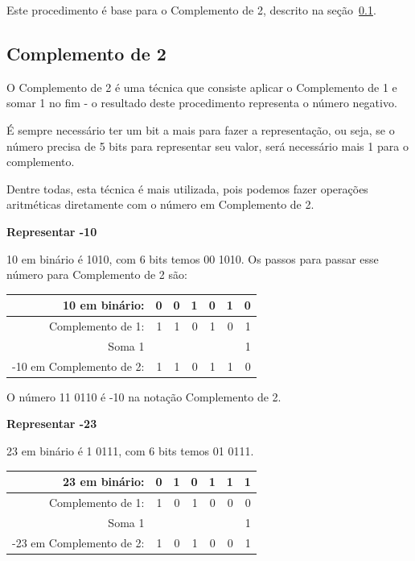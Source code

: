 Este procedimento é base para o Complemento de 2, descrito na seção~\ref{compl2}. 

\subsection{Complemento de 2}
\label{compl2}
O Complemento de 2 é uma técnica que consiste aplicar o Complemento de 1 e somar 1 no fim - o resultado deste procedimento representa o número negativo. 

É sempre necessário ter um bit a mais para fazer a representação, ou seja, se o número precisa de 5 bits para representar seu valor, será necessário mais 1 para o complemento.

Dentre todas, esta técnica é mais utilizada, pois podemos fazer operações aritméticas diretamente com o número em Complemento de 2. 

\noindent\textbf{Representar -10}

10 em binário é 1010, com 6 bits temos 00 1010. Os passos para passar esse número para Complemento de 2 são:

\begin{table}[h]
	\centering
	\begin{tabular}{|r|r|r|r|r|r|r|}
		\hline
		10 em binário: 			& 0 & 0 & 1  & 0 &  1 & 0 \\
		\hline
		Complemento de 1: 		& 1 & 1 & 0 & 1 & 0 & 1 \\
		\hline
		Soma 1 					&  	&  	&  	&	&	& 1 \\
		\hline
		\hline
		-10 em Complemento de 2:	& 1 & 1 & 0	& 1 & 1 & 0 \\
		\hline
	\end{tabular}
\end{table}
O número 11 0110 é -10 na notação Complemento de 2.

\noindent\textbf{Representar -23}

23 em binário é 1 0111, com 6 bits temos 01 0111. 
\begin{table}[h]
	\centering
	\begin{tabular}{|r|r|r|r|r|r|r|}
		\hline
		23 em binário: 			& 0 & 1 & 0  & 1 & 1 & 1 \\
		\hline
		Complemento de 1: 		& 1 & 0 & 1  & 0 & 0 & 0 \\
		\hline
		Soma 1 					&  	&  	&  	&	&	 & 1 \\
		\hline
		\hline
		-23 em Complemento de 2:	& 1 & 0 & 1	& 0 & 0 & 1 \\
		\hline
	\end{tabular}
\end{table}


